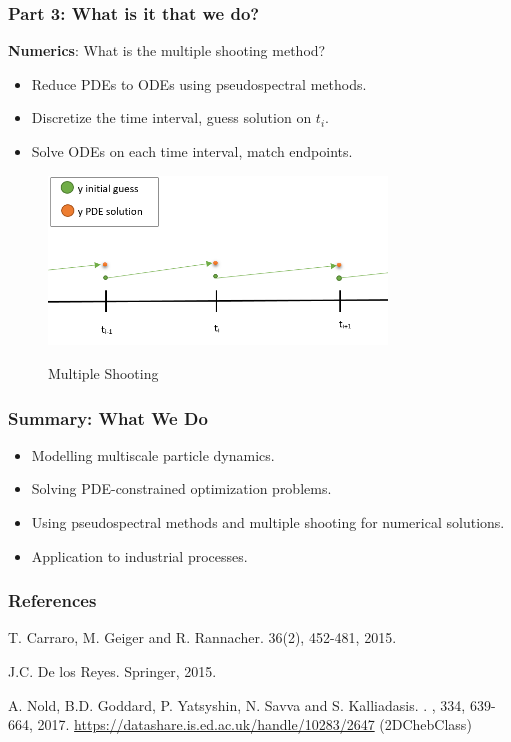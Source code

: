\documentclass[aspectratio=169,xcolor=dvipsnames]{beamer}
\begin{document}
\begin{frame}
	\frametitle{Part 3: What is it that we do?}
	\textbf{Numerics}: What is the multiple shooting method?\\
    \begin{itemize}
    	\item Reduce PDEs to ODEs using pseudospectral methods.
    	\item Discretize the time interval, guess solution on $t_i$.
        \item Solve ODEs on each time interval, match endpoints.
    \end{itemize}
	\begin{figure}
		\includegraphics[width=9cm]{rhoSol.png}\\
		\caption{Multiple Shooting}
	\end{figure}	
\end{frame}


\begin{frame}
	\frametitle{Summary: What We Do}
 \begin{itemize}
 	\item Modelling multiscale particle dynamics.
 	\item Solving PDE-constrained optimization problems.
 	\item Using pseudospectral methods and multiple shooting for numerical solutions.
 	\item Application to industrial processes.
 \end{itemize}
	
\end{frame}

\begin{frame}
\frametitle{References}    
\begin{thebibliography}{10}    

     T. Carraro, M. Geiger and R. Rannacher.
	 36(2), 452-481, 2015.
	
	J.C. De los Reyes.
	\newblock 	Springer, 2015.
	
	A. Nold, B.D. Goddard, P. Yatsyshin, N. Savva and S. Kalliadasis. 
	.
	, 334, 639-664, 2017.
	\newblock \url{https://datashare.is.ed.ac.uk/handle/10283/2647} (2DChebClass)
	
\end{thebibliography}
\end{frame}


\end{document}
